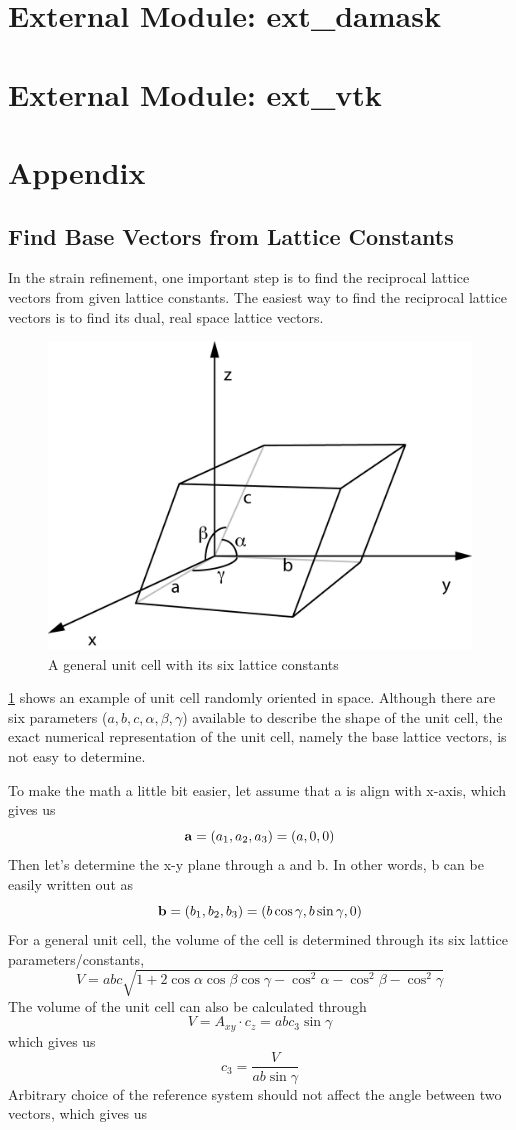 \documentclass[12pt]{scrartcl}
\begin{document}
\section{External Module: ext\_damask}

\section{External Module: ext\_vtk}

\section{Appendix}
\subsection{Find Base Vectors from Lattice Constants}
\label{sec:lc2bv}
In the strain refinement, one important step is to find the reciprocal lattice vectors from given lattice constants.
The easiest way to find the reciprocal lattice vectors is to find its dual, real space lattice vectors.

\begin{figure}[htp]
\centering
\includegraphics[width=.7\linewidth]{UnitCell.png}
\caption{A general unit cell with its six lattice constants}
\label{fig:unitcell}
\end{figure}

\cref{fig:unitcell} shows an example of unit cell randomly oriented in space.
Although there are six parameters ($a,b,c, \alpha, \beta, \gamma$) available to describe the shape of the unit cell, the exact numerical representation of the unit cell, namely the base lattice vectors, is not easy to determine.

To make the math a little bit easier, let assume that \vctr a is align with x-axis, which gives us
\[
	\mathbf{a} = (a_1, a_2, a_3) = (a, 0, 0)
\]
Then let's determine the x-y plane through \vctr a and \vctr b.
In other words, \vctr b can be easily written out as
\[
	\mathbf{b} = (b_1, b_2, b_3) = (b\cos\gamma, b\sin\gamma, 0)
\]
For a general unit cell, the volume of the cell is determined through its six lattice parameters/constants,
\[
	V = abc\sqrt{1 + 2\cos\alpha\cos\beta\cos\gamma - \cos^2\alpha-\cos^2\beta-\cos^2\gamma}
\]
The volume of the unit cell can also be calculated through
\[
	V = A_{xy}\cdot c_z = abc_3\sin\gamma
\]
which gives us
\[
	c_3 = \dfrac{V}{ab\sin\gamma}
\]
Arbitrary choice of the reference system should not affect the angle between two vectors, which gives us
\end{document}
